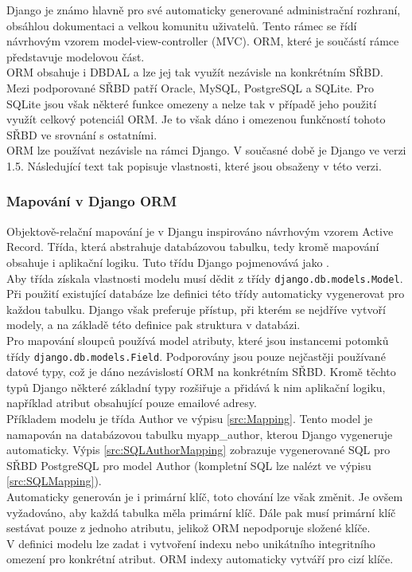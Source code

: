 \documentclass[ing,male,java,dept456]{diploma}						%
\begin{document}
Django je známo hlavně pro své automaticky generované administrační rozhraní, obsáhlou dokumentaci a velkou komunitu uživatelů. Tento rámec se řídí návrhovým vzorem model-view-controller (MVC). ORM, které je součástí rámce představuje modelovou část. \\ 
ORM obsahuje i DBDAL a lze jej tak využít nezávisle na konkrétním SŘBD. Mezi podporované SŘBD patří Oracle, MySQL, PostgreSQL a SQLite. Pro SQLite jsou však některé funkce omezeny a nelze tak v případě jeho použití využít celkový potenciál ORM. Je to však dáno i omezenou funkčností tohoto SŘBD ve srovnání s ostatními. \\
ORM lze používat nezávisle na rámci Django. V současné době je Django ve verzi 1.5. Následující text tak popisuje vlastnosti, které jsou obsaženy v této verzi.

\subsubsection{Mapování v Django ORM}

Objektově-relační mapování je v Djangu inspirováno návrhovým vzorem Active Record. Třída, která abstrahuje databázovou tabulku, tedy kromě mapování obsahuje i aplikační logiku. Tuto třídu Django pojmenovává jako . \\
Aby třída získala vlastnosti modelu musí dědit z třídy \lstinline[style=custompython]|django.db.models.Model|. Při použití existující databáze lze definici této třídy automaticky vygenerovat pro každou tabulku. Django však preferuje přístup, při kterém se nejdříve vytvoří modely, a na základě této definice pak struktura v databázi. \\
Pro mapování sloupců používá model atributy, které jsou instancemi potomků třídy \lstinline[style=custompython]|django.db.models.Field|. Podporovány jsou pouze nejčastěji používané datové typy, což je dáno nezávislostí ORM na konkrétním SŘBD. Kromě těchto typů Django některé základní typy rozšiřuje a přidává k nim aplikační logiku, například atribut obsahující pouze emailové adresy. \\

Příkladem modelu je třída Author ve výpisu \ref{src:Mapping}. Tento model je namapován na databázovou tabulku myapp\_author, kterou Django vygeneruje automaticky. Výpis \ref{src:SQLAuthorMapping} zobrazuje vygenerované SQL pro SŘBD PostgreSQL pro model Author (kompletní SQL lze nalézt ve výpisu \ref{src:SQLMapping}). \\
Automaticky generován je i primární klíč, toto chování lze však změnit. Je ovšem vyžadováno, aby každá tabulka měla primární klíč. Dále pak musí primární klíč sestávat pouze z jednoho atributu, jelikož ORM nepodporuje složené klíče. \\
V definici modelu lze zadat i vytvoření indexu nebo unikátního integritního omezení pro konkrétní atribut. ORM indexy automaticky vytváří pro cizí klíče. \\
\end{document}
